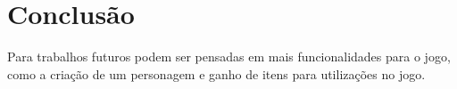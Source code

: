\chapter[Conclusão]{Conclusão}
Para trabalhos futuros podem ser pensadas em mais funcionalidades para o jogo, como a criação de um personagem e ganho de itens para utilizações no jogo.